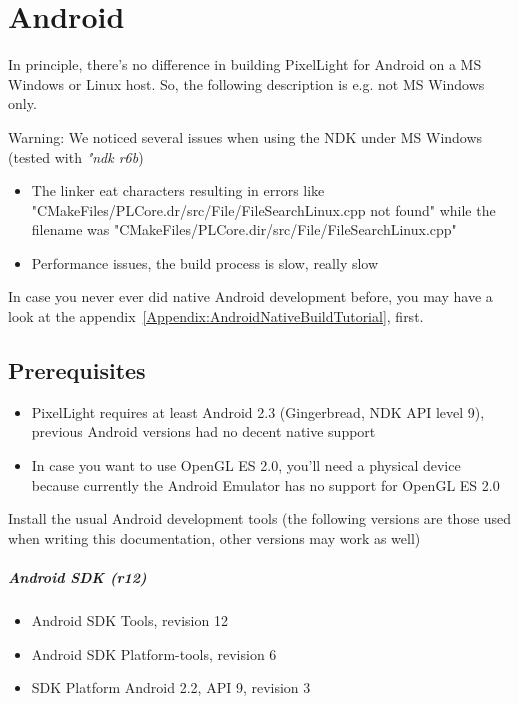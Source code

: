 \chapter{Android}
In principle, there's no difference in building PixelLight for Android on a MS Windows or Linux host. So, the following description is e.g. not MS Windows only.

Warning: We noticed several issues when using the \ac{NDK} under MS Windows (tested with \emph{"ndk r6b})
\begin{itemize}
\item{The linker eat characters resulting in errors like "CMakeFiles/PLCore.dr/src/File/FileSearchLinux.cpp not found" while the filename was "CMakeFiles/PLCore.dir/src/File/FileSearchLinux.cpp"}
\item{Performance issues, the build process is slow, really slow}
\end{itemize}

In case you never ever did native Android development before, you may have a look at the appendix~\ref{Appendix:AndroidNativeBuildTutorial}, first.




\section{Prerequisites}
\begin{itemize}
\item{PixelLight requires at least Android 2.3 (Gingerbread, \ac{NDK} \ac{API} level 9), previous Android versions had no decent native support}
\item{In case you want to use OpenGL ES 2.0, you'll need a physical device because currently the Android Emulator has no support for OpenGL ES 2.0}
\end{itemize}

Install the usual Android development tools (the following versions are those used when writing this documentation, other versions may work as well)


\paragraph{Android \ac{SDK} (\emph{r12})}
\begin{itemize}
\item{Android \ac{SDK} Tools, revision 12}
\item{Android \ac{SDK} Platform-tools, revision 6}
\item{\ac{SDK} Platform Android 2.2, \ac{API} 9, revision 3}
\end{itemize}



